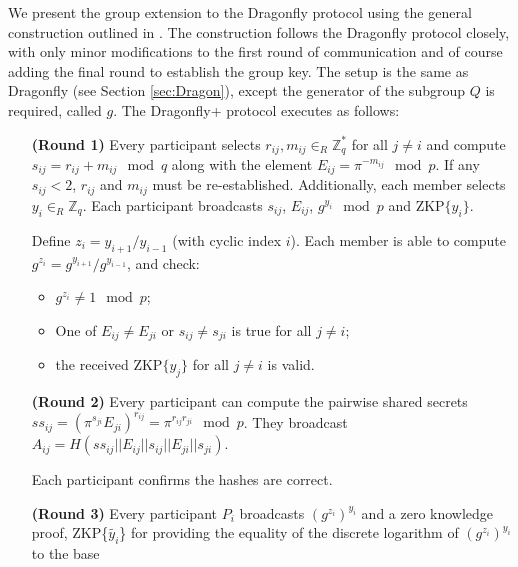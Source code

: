 

We present the group extension to the Dragonfly protocol using the general construction outlined in \cite{HaYiChSh15}.
The construction follows the Dragonfly protocol closely, with only minor modifications to the first round of communication
and of course adding the final round to establish the group key. The setup is the same as Dragonfly (see Section \ref{sec:Dragon}),
except the generator of the subgroup $Q$ is required, called $g$. The Dragonfly+ protocol executes as follows:

\begin{itemize}
    \item[\textbf{(Round 1)}] Every participant selects $r_{ij}, m_{ij} \in_R \mathbb{Z}_q^*$ for all $j \neq i$ and
        compute $s_{ij} = r_{ij} + m_{ij} \mod q$ along with the element $E_{ij} = \pi^{-m_{ij}} \mod p$. If any $s_{ij} < 2$, $r_{ij}$ and $m_{ij}$
        must be re-established. Additionally, each member selects $y_i \in_R \mathbb{Z}_q$.
        Each participant broadcasts $s_{ij}$, $E_{ij}$, $g^{y_i} \mod p$ and $\text{ZKP}\{y_i\}$.
    \item[]
    \item[] Define $z_i = y_{i+1} / y_{i-1}$ (with cyclic index $i$). Each member is able to compute $g^{z_i} = g^{y_{i+1}} / g^{y_{i-1}}$, and check:
        \begin{itemize}
            \item $g^{z_i} \neq 1 \mod p$;
            \item One of $E_{ij} \neq E_{ji}$ or $s_{ij} \neq s_{ji}$ is true for all $j \neq i$;
            \item the received $\text{ZKP}\{y_j\}$ for all $j \neq i$ is valid.
        \end{itemize}
    \item[]
    \item[\textbf{(Round 2)}] Every participant can compute the pairwise shared secrets $ss_{ij} = (\pi^{s_{ji}} E_{ji})^{r_{ij}} = \pi^{r_{ij} r_{ji}} \mod p$.
        They broadcast $A_{ij} = H(ss_{ij} || E_{ij} || s_{ij} || E_{ji} || s_{ji})$.
    \item[]
    \item[] Each participant confirms the hashes are correct.
    \item[]
    \item[\textbf{(Round 3)}] Every participant $P_i$ broadcasts $(g^{z_i})^{y_i}$ and a zero knowledge proof,
        ZKP\{$\tilde{y_i}$\} for providing the equality of the discrete logarithm of $(g^{z_i})^{y_i}$ to the base

\end{itemize}
